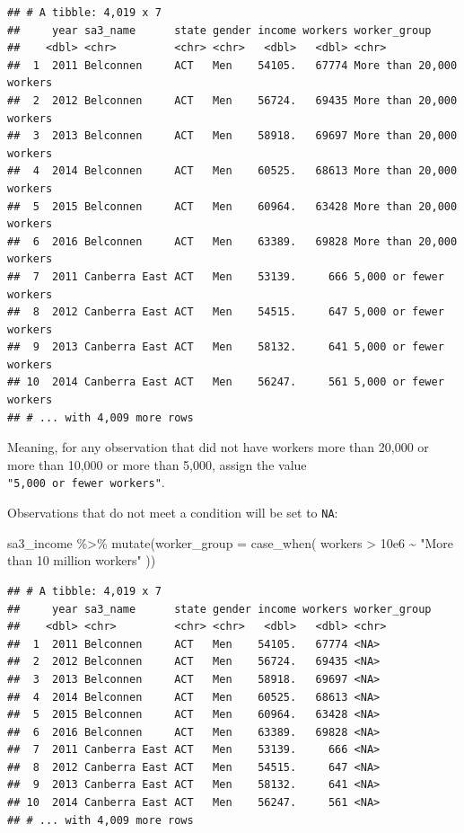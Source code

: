 \documentclass[
]{book}
\newenvironment{Shaded}{\begin{snugshade}}{\end{snugshade}}
\newcommand{\AttributeTok}[1]{\textcolor[rgb]{0.77,0.63,0.00}{#1}}
\newcommand{\FloatTok}[1]{\textcolor[rgb]{0.00,0.00,0.81}{#1}}
\newcommand{\FunctionTok}[1]{\textcolor[rgb]{0.00,0.00,0.00}{#1}}
\newcommand{\NormalTok}[1]{#1}
\newcommand{\SpecialCharTok}[1]{\textcolor[rgb]{0.00,0.00,0.00}{#1}}
\newcommand{\StringTok}[1]{\textcolor[rgb]{0.31,0.60,0.02}{#1}}
\begin{document}
\begin{verbatim}
## # A tibble: 4,019 x 7
##     year sa3_name      state gender income workers worker_group            
##    <dbl> <chr>         <chr> <chr>   <dbl>   <dbl> <chr>                   
##  1  2011 Belconnen     ACT   Men    54105.   67774 More than 20,000 workers
##  2  2012 Belconnen     ACT   Men    56724.   69435 More than 20,000 workers
##  3  2013 Belconnen     ACT   Men    58918.   69697 More than 20,000 workers
##  4  2014 Belconnen     ACT   Men    60525.   68613 More than 20,000 workers
##  5  2015 Belconnen     ACT   Men    60964.   63428 More than 20,000 workers
##  6  2016 Belconnen     ACT   Men    63389.   69828 More than 20,000 workers
##  7  2011 Canberra East ACT   Men    53139.     666 5,000 or fewer workers  
##  8  2012 Canberra East ACT   Men    54515.     647 5,000 or fewer workers  
##  9  2013 Canberra East ACT   Men    58132.     641 5,000 or fewer workers  
## 10  2014 Canberra East ACT   Men    56247.     561 5,000 or fewer workers  
## # ... with 4,009 more rows
\end{verbatim}

Meaning, for any observation that did not have workers more than 20,000 or more than 10,000 or more than 5,000, assign the value \texttt{"5,000\ or\ fewer\ workers"}.

Observations that do not meet a condition will be set to \texttt{NA}:

\begin{Shaded}
\begin{Highlighting}[]
\NormalTok{sa3\_income }\SpecialCharTok{\%\textgreater{}\%} 
  \FunctionTok{mutate}\NormalTok{(}\AttributeTok{worker\_group =} \FunctionTok{case\_when}\NormalTok{(}
\NormalTok{    workers }\SpecialCharTok{\textgreater{}} \FloatTok{10e6} \SpecialCharTok{\textasciitilde{}} \StringTok{"More than 10 million workers"}
\NormalTok{  ))}
\end{Highlighting}
\end{Shaded}

\begin{verbatim}
## # A tibble: 4,019 x 7
##     year sa3_name      state gender income workers worker_group
##    <dbl> <chr>         <chr> <chr>   <dbl>   <dbl> <chr>       
##  1  2011 Belconnen     ACT   Men    54105.   67774 <NA>        
##  2  2012 Belconnen     ACT   Men    56724.   69435 <NA>        
##  3  2013 Belconnen     ACT   Men    58918.   69697 <NA>        
##  4  2014 Belconnen     ACT   Men    60525.   68613 <NA>        
##  5  2015 Belconnen     ACT   Men    60964.   63428 <NA>        
##  6  2016 Belconnen     ACT   Men    63389.   69828 <NA>        
##  7  2011 Canberra East ACT   Men    53139.     666 <NA>        
##  8  2012 Canberra East ACT   Men    54515.     647 <NA>        
##  9  2013 Canberra East ACT   Men    58132.     641 <NA>        
## 10  2014 Canberra East ACT   Men    56247.     561 <NA>        
## # ... with 4,009 more rows
\end{verbatim}
\end{document}
